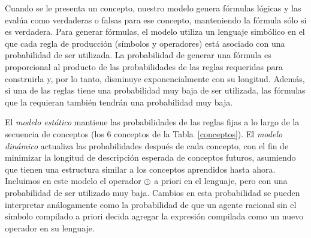Cuando se le presenta un concepto, nuestro modelo genera fórmulas lógicas y las evalúa como verdaderas o falsas para ese concepto, manteniendo la fórmula sólo si es verdadera. Para generar fórmulas, el modelo utiliza un lenguaje simbólico en el que cada regla de producción (símbolos y operadores) está asociado con una probabilidad de ser utilizada. La probabilidad de generar una fórmula es proporcional al producto de las probabilidades de las reglas requeridas para construirla y, por lo tanto, disminuye exponencialmente con su longitud. Además, si una de las reglas tiene una probabilidad muy baja de ser utilizada, las fórmulas que la requieran también tendrán una probabilidad muy baja.



El \textit{modelo estático} mantiene las probabilidades de las reglas fijas a lo largo de la secuencia de conceptos (los 6 conceptos de la Tabla~\ref{conceptos}). El \textit{modelo dinámico} actualiza las probabilidades después de cada concepto, con el fin de minimizar la longitud de descripción esperada de conceptos futuros, asumiendo que tienen una estructura similar a los conceptos aprendidos hasta ahora. Incluimos en este modelo el operador $\oplus$ a priori en el lenguaje, pero con una probabilidad de ser utilizado muy baja. Cambios en esta probabilidad se pueden interpretar análogamente como la probabilidad de que un agente racional sin el símbolo compilado a priori decida agregar la expresión compilada como un nuevo operador en su lenguaje.


